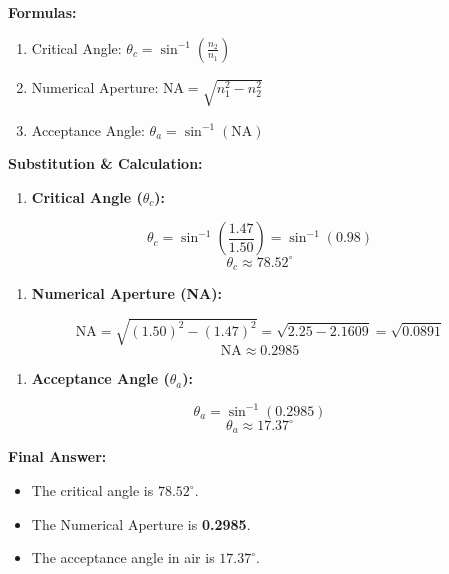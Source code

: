 \textbf{Formulas:}
\begin{enumerate}
  \item Critical Angle: $\theta_c = \sin^{-1}\left(\frac{n_2}{n_1}\right)$
  \item Numerical Aperture: $\text{NA} = \sqrt{n_1^2 - n_2^2}$
  \item Acceptance Angle: $\theta_a = \sin^{-1}(\text{NA})$
\end{enumerate}

\textbf{Substitution \& Calculation:}
\begin{enumerate}
  \item \textbf{Critical Angle ($\theta_c$):}
\end{enumerate}
    \[ \theta_c = \sin^{-1}\left(\frac{1.47}{1.50}\right) = \sin^{-1}(0.98) \]
    \[ \theta_c \approx 78.52^\circ \]
\begin{enumerate}
  \item \textbf{Numerical Aperture (NA):}
\end{enumerate}
    \[ \text{NA} = \sqrt{(1.50)^2 - (1.47)^2} = \sqrt{2.25 - 2.1609} = \sqrt{0.0891} \]
    \[ \text{NA} \approx 0.2985 \]
\begin{enumerate}
  \item \textbf{Acceptance Angle ($\theta_a$):}
\end{enumerate}
    \[ \theta_a = \sin^{-1}(0.2985) \]
    \[ \theta_a \approx 17.37^\circ \]

\textbf{Final Answer:}
\begin{itemize}
  \item   The critical angle is \textbf{$78.52^\circ$}.
  \item   The Numerical Aperture is \textbf{0.2985}.
  \item   The acceptance angle in air is \textbf{$17.37^\circ$}.
\end{itemize}
